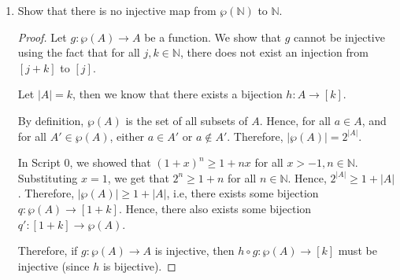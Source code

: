 \documentclass[11pt]{article}
\newcommand{\bbN}{\mathbb{N}}
\theoremstyle{definition}
\numberwithin{equation}{subsection}
\begin{document}
\begin{enumerate}
\begin{enumerate}
\begin{proof}[Second Proof Attempt]
Let $|A|=k$, then we know that there exists a bijection $h \colon A \rightarrow [k]$. 

By definition, $\wp(A)$ is the set of all subsets of $A$. Hence, for all $a \in A$, and for all $A' \in \wp(A)$, either $a \in A'$ or $a \notin A'$. Therefore, $|\wp(A)| = 2^{|A|}$. 

In Script 0, we showed that $(1+x)^n \geq 1 + nx$ for all $x > -1, n\in \bbN$. Substituting $x = 1$, we get that $2^n \geq 1+n$ for all $n \in \bbN$. Hence, $2^{|A|} \geq 1 + |A|$. Therefore, $|\wp(A)| \geq 1+ |A|$, i.e, there exists some bijection $q \colon \wp(A) \rightarrow [1+k]$. Hence, there also exists some bijection $q' \colon [1+k] \rightarrow \wp(A)$.

Therefore, if $g \colon \wp(A) \rightarrow A$ is bijective, then $h\circ g \colon \wp(A) \rightarrow [k]$ must be bijective. 

Hence, $h \circ g \circ q' \colon [1+k] \rightarrow [k]$ must be bijective. We know that $h \circ g \circ q'$ cannot be injective, hence it cannot be bijective.

We have reached a contradiction, and this completes the proof.



\renewcommand\qedsymbol{QED}
\end{proof}
 
\item
Show that there is no injective map from $\wp(\bbN)$ to $\bbN.$

\begin{proof}
Let $g \colon \wp(A) \rightarrow A$ be a function. We show that $g$ cannot be injective using the fact that for all $j,k \in \bbN$, there does not exist an injection from $[j+k]$ to $[j]$.

Let $|A|=k$, then we know that there exists a bijection $h \colon A \rightarrow [k]$. 

By definition, $\wp(A)$ is the set of all subsets of $A$. Hence, for all $a \in A$, and for all $A' \in \wp(A)$, either $a \in A'$ or $a \notin A'$. Therefore, $|\wp(A)| = 2^{|A|}$. 

In Script 0, we showed that $(1+x)^n \geq 1 + nx$ for all $x > -1, n\in \bbN$. Substituting $x = 1$, we get that $2^n \geq 1+n$ for all $n \in \bbN$. Hence, $2^{|A|} \geq 1 + |A|$. Therefore, $|\wp(A)| \geq 1+ |A|$, i.e, there exists some bijection $q \colon \wp(A) \rightarrow [1+k]$. Hence, there also exists some bijection $q' \colon [1+k] \rightarrow \wp(A)$.

Therefore, if $g \colon \wp(A) \rightarrow A$ is injective, then $h\circ g \colon \wp(A) \rightarrow [k]$ must be injective (since $h$ is bijective). 


\end{proof}
\end{enumerate}
\end{enumerate}
\end{document}
